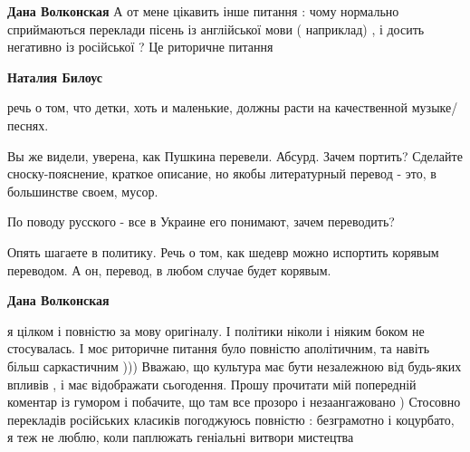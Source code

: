 \begin{itemize}
\begin{itemize}
 
\textbf{Дана Волконская} 
А от мене цікавить інше питання : чому нормально сприймаються переклади пісень
із англійської мови ( наприклад) , і досить негативно із російської ? Це
риторичне питання

\begin{itemize}
 
\textbf{Наталия Билоус} 

речь о том, что детки, хоть и маленькие, должны расти на качественной
музыке/песнях.

Вы же видели, уверена, как Пушкина перевели. Абсурд. Зачем портить? Сделайте
сноску-пояснение, краткое описание, но якобы литературный перевод - это, в
большинстве своем, мусор.

По поводу русского - все в Украине его понимают, зачем переводить?

Опять шагаете в политику. Речь о том, как шедевр можно испортить корявым
переводом. А он, перевод, в любом случае будет корявым.

 
\textbf{Дана Волконская} 

я цілком і повністю за мову оригіналу. І політики ніколи і ніяким боком не
стосувалась. І моє риторичне питання було повністю аполітичним, та навіть більш
саркастичним ))) Вважаю, що культура має бути незалежною від будь-яких впливів
, і має відображати сьогодення. Прошу прочитати мій попередній коментар із
гумором і побачите, що там все прозоро і незаангажовано ) Стосовно перекладів
російських класиків погоджуюсь повністю : безграмотно і коцурбато, я теж не
люблю, коли паплюжать геніальні витвори мистецтва

\end{itemize}


\end{itemize}
\end{itemize}
